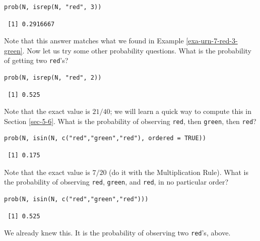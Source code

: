 \documentclass[captions=tableheading]{scrbook}
\begin{document}
\begin{verbatim}
prob(N, isrep(N, "red", 3))
\end{verbatim}

\begin{verbatim}
 [1] 0.2916667
\end{verbatim}

Note that this answer matches what we found in Example \ref{exa-urn-7-red-3-green}. Now let us try some other probability questions. What is the probability of getting two \texttt{red}'s?


\begin{verbatim}
prob(N, isrep(N, "red", 2))
\end{verbatim}

\begin{verbatim}
 [1] 0.525
\end{verbatim}

Note that the exact value is \(21/40\); we will learn a quick way to compute this in Section \ref{sec-5-6}. What is the probability of observing \texttt{red}, then \texttt{green}, then \texttt{red}?


\begin{verbatim}
prob(N, isin(N, c("red","green","red"), ordered = TRUE))
\end{verbatim}

\begin{verbatim}
 [1] 0.175
\end{verbatim}

Note that the exact value is \(7/20\) (do it with the Multiplication Rule). What is the probability of observing \texttt{red}, \texttt{green}, and \texttt{red}, in no particular order?


\begin{verbatim}
prob(N, isin(N, c("red","green","red")))
\end{verbatim}

\begin{verbatim}
 [1] 0.525
\end{verbatim}

We already knew this. It is the probability of observing two \texttt{red}'s, above.
\end{document}
